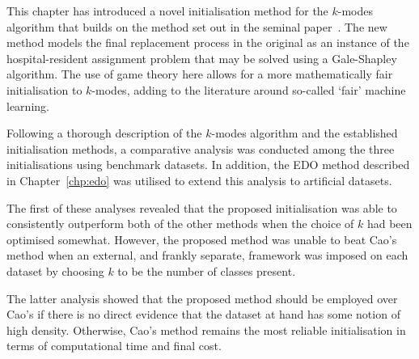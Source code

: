 This chapter has introduced a novel initialisation method for the \(k\)-modes
algorithm that builds on the method set out in the seminal
paper~\cite{Huang1998}. The new method models the final replacement process in
the original as an instance of the hospital-resident assignment problem that may
be solved using a Gale-Shapley algorithm. The use of game theory here allows for
a more mathematically fair initialisation to \(k\)-modes, adding to the
literature around so-called `fair' machine learning.

Following a thorough description of the \(k\)-modes algorithm and the
established initialisation methods, a comparative analysis was conducted among
the three initialisations using benchmark datasets. In addition, the EDO method
described in Chapter~\ref{chp:edo} was utilised to extend this analysis to
artificial datasets.

The first of these analyses revealed that the proposed initialisation was able
to consistently outperform both of the other methods when the choice of \(k\)
had been optimised somewhat. However, the proposed method was unable to beat
Cao's method when an external, and frankly separate, framework was imposed on
each dataset by choosing \(k\) to be the number of classes present.

The latter analysis showed that the proposed method should be employed over
Cao's if there is no direct evidence that the dataset at hand has some notion of
high density. Otherwise, Cao's method remains the most reliable initialisation
in terms of computational time and final cost.
